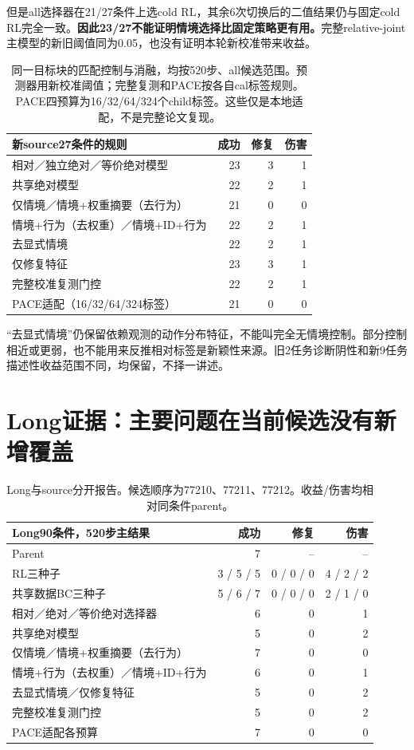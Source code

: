 \documentclass[UTF8,a4paper,fontset=none,zihao=-4]{ctexart}
\begin{document}
但是all选择器在21/27条件上选cold RL，其余6次切换后的二值结果仍与固定cold RL完全一致。\textbf{因此23/27不能证明情境选择比固定策略更有用。}完整relative-joint主模型的新旧阈值同为0.05，也没有证明本轮新校准带来收益。
\par
\begin{table}[htbp]\centering\small
\noindent\begin{tabularx}{\textwidth}{Yrrr}\toprule
新source27条件的规则 & 成功 & 修复 & 伤害\\\midrule
相对／独立绝对／等价绝对模型 &23&3&1\\
共享绝对模型 &22&2&1\\
仅情境／情境+权重摘要（去行为） &21&0&0\\
情境+行为（去权重）／情境+ID+行为 &22&2&1\\
去显式情境 &22&2&1\\
仅修复特征 &23&3&1\\
完整校准复测门控 &22&2&1\\
PACE适配（16/32/64/324标签） &21&0&0\\\bottomrule
\end{tabularx}
\caption{同一目标块的匹配控制与消融，均按520步、all候选范围。预测器用新校准阈值；完整复测和PACE按各自cal标签规则。PACE四预算为16/32/64/324个child标签。这些仅是本地适配，不是完整论文复现。}
\end{table}
\par
“去显式情境”仍保留依赖观测的动作分布特征，不能叫完全无情境控制。部分控制相近或更弱，也不能用来反推相对标签是新颖性来源。旧2任务诊断阴性和新9任务描述性收益范围不同，均保留，不择一讲述。
\section{Long证据：主要问题在当前候选没有新增覆盖}
\par
\begin{table}[htbp]\centering\small
\noindent\begin{tabularx}{\textwidth}{Yrrr}\toprule
Long90条件，520步主结果 & 成功 & 修复 & 伤害\\\midrule
Parent &7&--&--\\
RL三种子 &3 / 5 / 5&0 / 0 / 0&4 / 2 / 2\\
共享数据BC三种子 &5 / 6 / 7&0 / 0 / 0&2 / 1 / 0\\
相对／绝对／等价绝对选择器 &6&0&1\\
共享绝对模型 &5&0&2\\
仅情境／情境+权重摘要（去行为） &7&0&0\\
情境+行为（去权重）／情境+ID+行为 &6&0&1\\
去显式情境／仅修复特征 &5&0&2\\
完整校准复测门控 &5&0&2\\
PACE适配各预算 &7&0&0\\\bottomrule
\end{tabularx}
\caption{Long与source分开报告。候选顺序为77210、77211、77212。收益/伤害均相对同条件parent。}
\end{table}
\par
\end{document}
